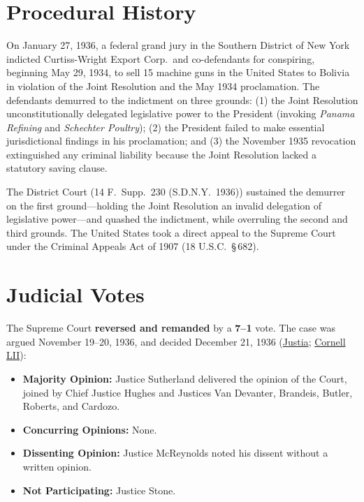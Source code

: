 \documentclass[12pt]{article}
\begin{document}
\section{Procedural History}
On January 27, 1936, a federal grand jury in the Southern District of New York indicted Curtiss-Wright Export Corp.\ and co-defendants for conspiring, beginning May 29, 1934, to sell 15 machine guns in the United States to Bolivia in violation of the Joint Resolution and the May 1934 proclamation. The defendants demurred to the indictment on three grounds: (1) the Joint Resolution unconstitutionally delegated legislative power to the President (invoking \textit{Panama Refining} and \textit{Schechter Poultry}); (2) the President failed to make essential jurisdictional findings in his proclamation; and (3) the November 1935 revocation extinguished any criminal liability because the Joint Resolution lacked a statutory saving clause.

The District Court (14 F.\ Supp.\ 230 (S.D.N.Y.\ 1936)) sustained the demurrer on the first ground---holding the Joint Resolution an invalid delegation of legislative power---and quashed the indictment, while overruling the second and third grounds. The United States took a direct appeal to the Supreme Court under the Criminal Appeals Act of 1907 (18 U.S.C.\ \S\,682).

\section{Judicial Votes}
The Supreme Court \textbf{reversed and remanded} by a \textbf{7--1} vote. The case was argued November 19--20, 1936, and decided December 21, 1936 (\href{https://supreme.justia.com/cases/federal/us/299/304/}{Justia}; \href{https://www.law.cornell.edu/supremecourt/text/299/304}{Cornell LII}):

\begin{itemize}
    \item \textbf{Majority Opinion:} Justice Sutherland delivered the opinion of the Court, joined by Chief Justice Hughes and Justices Van Devanter, Brandeis, Butler, Roberts, and Cardozo.
    \item \textbf{Concurring Opinions:} None.
    \item \textbf{Dissenting Opinion:} Justice McReynolds noted his dissent without a written opinion.
    \item \textbf{Not Participating:} Justice Stone.
\end{itemize}
\end{document}
